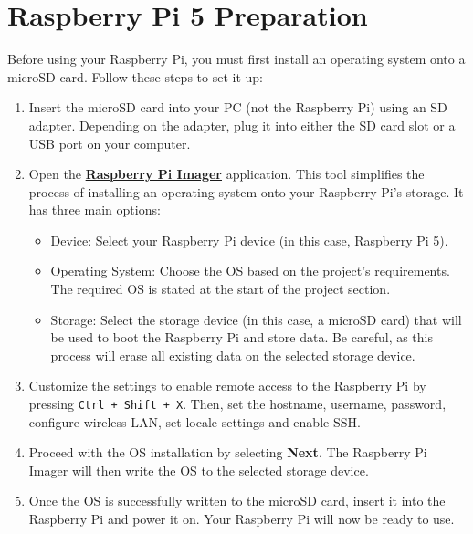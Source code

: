 \section*{ Raspberry Pi 5 Preparation}

Before using your Raspberry Pi, you must first install an operating system onto a microSD card. Follow these steps to set it up:
\begin{enumerate}
\item Insert the microSD card into your PC (not the Raspberry Pi) using an SD adapter. Depending on the adapter, plug it into either the SD card slot or a USB port on your computer.
\item Open the \href{https://www.raspberrypi.com/software}{\textbf{\color{blue}Raspberry Pi Imager}} application. This tool simplifies the process of installing an operating system onto your Raspberry Pi’s storage. It has three main options:
\begin{itemize}
\item Device: Select your Raspberry Pi device (in this case, Raspberry Pi 5).
\item Operating System: Choose the OS based on the project’s requirements. The required OS is stated at the start of the project section.
\item Storage: Select the storage device (in this case, a microSD card) that will be used to boot the Raspberry Pi and store data. Be careful, as this process will erase all existing data on the selected storage device.
\end{itemize}
\item Customize the settings to enable remote access to the Raspberry Pi by pressing \texttt{Ctrl + Shift + X}. Then, set the hostname, username, password, configure wireless LAN, set locale settings and enable SSH.
\item Proceed with the OS installation by selecting \textbf{Next}. The Raspberry Pi Imager will then write the OS to the selected storage device.
\item Once the OS is successfully written to the microSD card, insert it into the Raspberry Pi and power it on. Your Raspberry Pi will now be ready to use.
\end{enumerate}

